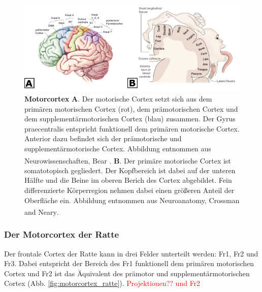 \documentclass[12pt,a4paper,pdftex]{article}
\begin{document}
\begin{figure}[H]
    \centering
    \includegraphics[width=\textwidth]{pictures/Bilder_Laura/Motorcortex_2.png}
    \caption[Motorcortex]{\textbf{Motorcortex} \textbf{A}. Der motorische Cortex setzt sich aus dem primären motorischen Cortex (rot), dem prämotorischen Cortex und dem supplementärmotorischen Cortex (blau) zusammen. Der Gyrus praecentralis entspricht funktionell dem primären motorische Cortex. Anterior dazu befindet sich der prämotorische und supplementärmotorische Cortex. Abbildung entnommen aus Neurowissenschaften, Bear \textsuperscript{\cite[14]{neurowissenschaften_baer}}. \textbf{B}. Der primäre motorische Cortex ist somatotopisch gegliedert. Der Kopfbereich ist dabei auf der unteren Hälfte und die Beine im oberen Berich des Cortex abgebildet. Fein differenzierte Körperregion nehmen dabei einen größeren Anteil der Oberfläche ein. Abbildung entnommen aus Neuroanatomy, Crossman and Neary\textsuperscript{\cite[8]{crossman2014neuroanatomy}}.}
    \label{fig:motorkortex}
\end{figure}

\subsubsection*{Der Motorcortex der Ratte}
Der frontale Cortex der Ratte kann in drei Felder unterteilt werden: Fr1, Fr2 und Fr3. 
Dabei entspricht der Bereich des Fr1 funktionell dem primären motorischen Cortex und Fr2 ist das Äquivalent des prämotor und supplementärmotorischen Cortex (Abb. \ref{fig:motorcortex_ratte}). \textcolor{red}{Projektionen?? und Fr2}
\end{document}
